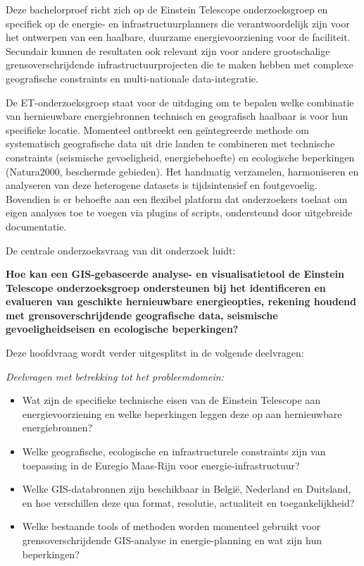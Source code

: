 Deze bachelorproef richt zich op de Einstein Telescope onderzoeksgroep en specifiek op de energie- en infrastructuurplanners die verantwoordelijk zijn voor het ontwerpen van een haalbare, duurzame energievoorziening voor de faciliteit. Secundair kunnen de resultaten ook relevant zijn voor andere grootschalige grensoverschrijdende infrastructuurprojecten die te maken hebben met complexe geografische constraints en multi-nationale data-integratie.

De ET-onderzoeksgroep staat voor de uitdaging om te bepalen welke combinatie van hernieuwbare energiebronnen technisch en geografisch haalbaar is voor hun specifieke locatie. Momenteel ontbreekt een geïntegreerde methode om systematisch geografische data uit drie landen te combineren met technische constraints (seismische gevoeligheid, energiebehoefte) en ecologische beperkingen (Natura2000, beschermde gebieden). Het handmatig verzamelen, harmoniseren en analyseren van deze heterogene datasets is tijdsintensief en foutgevoelig. Bovendien is er behoefte aan een flexibel platform dat onderzoekers toelaat om eigen analyses toe te voegen via plugins of scripts, ondersteund door uitgebreide documentatie.

De centrale onderzoeksvraag van dit onderzoek luidt: 

\textbf{Hoe kan een GIS-gebaseerde analyse- en visualisatietool de Einstein Telescope onderzoeksgroep ondersteunen bij het identificeren en evalueren van geschikte hernieuwbare energieopties, rekening houdend met grensoverschrijdende geografische data, seismische gevoeligheidseisen en ecologische beperkingen?}

Deze hoofdvraag wordt verder uitgesplitst in de volgende deelvragen:

\textit{Deelvragen met betrekking tot het probleemdomein:}
\begin{itemize}
    \item Wat zijn de specifieke technische eisen van de Einstein Telescope aan energievoorziening en welke beperkingen leggen deze op aan hernieuwbare energiebronnen?
    \item Welke geografische, ecologische en infrastructurele constraints zijn van toepassing in de Euregio Maas-Rijn voor energie-infrastructuur?
    \item Welke GIS-databronnen zijn beschikbaar in België, Nederland en Duitsland, en hoe verschillen deze qua format, resolutie, actualiteit en toegankelijkheid?
    \item Welke bestaande tools of methoden worden momenteel gebruikt voor grensoverschrijdende GIS-analyse in energie-planning en wat zijn hun beperkingen?
\end{itemize}

